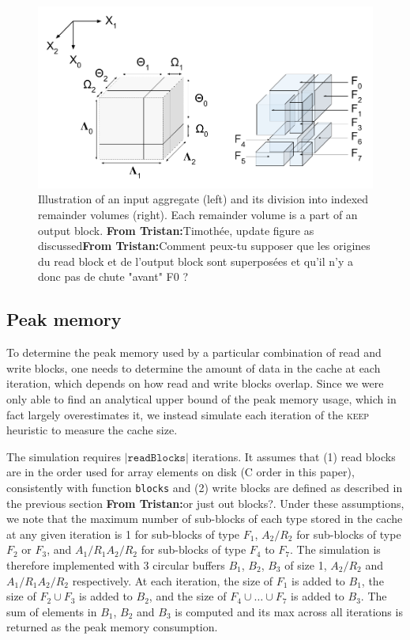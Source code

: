 \documentclass[sigconf, nonacm]{acmart}
\newcommand{\tristan}[1]{\color{orange}\textbf{From Tristan:}#1\color{black}}
\newcommand{\keep}[0]{\textsc{keep}\xspace}
\begin{document}
\begin{figure}[h]
  \centering
  \includegraphics[scale=0.4]{./figures/figure_3.png}
  \caption{Illustration of an input aggregate (left) and its division into indexed remainder volumes (right).
  Each remainder volume is a part of an output block. \tristan{Timothée,
  update figure as discussed}\tristan{Comment peux-tu supposer que les
  origines du read block et de l'output block sont superposées et qu'il n'y
  a donc pas de chute "avant" F0 ?}}
  \label{fig:nomenclature_overlaps}
  \end{figure}

\subsection{Peak memory}

To determine the peak memory used by a particular combination of read and
write blocks, one needs to determine the amount of data in the cache at
each iteration, which depends on how read and write blocks overlap. Since we were only able to find an analytical
upper bound of the peak memory usage, which in fact largely overestimates
it, we instead simulate each iteration of the \keep heuristic to measure
the cache size.

The simulation requires $\vert \texttt{readBlocks} \vert$ iterations. It
assumes that (1) read blocks are in the order used for array elements on
disk (C order in this paper), consistently with function \texttt{blocks}
and (2) write blocks are defined as described in the previous section
\tristan{or just out blocks?}. Under these assumptions, we note that the
maximum number of sub-blocks of each type stored in the cache at any given
iteration is 1 for sub-blocks of type $F_1$, $A_2/R_2$ for sub-blocks of
type $F_2$ or $F_3$, and $A_1/R_1A_2/R_2$ for sub-blocks of type $F_4$ to
$F_7$. The simulation is therefore implemented with 3 circular buffers
$B_1$, $B_2$, $B_3$ of size 1, $A_2/R_2$ and $A_1/R_1A_2/R_2$ respectively.
At each iteration, the size of $F_1$ is added to $B_1$, the size of $F_2
\cup F_3$ is added to $B_2$, and the size of $F_4 \cup \ldots \cup F_7$ is
added to $B_3$. The sum of elements in $B_1$, $B_2$ and $B_3$ is computed
and its max across all iterations is returned as the peak memory
consumption.
\end{document}
